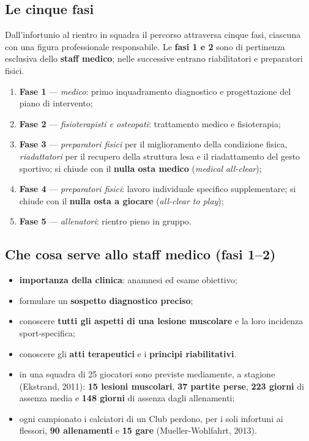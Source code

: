 \subsection{Le cinque fasi}

Dall'infortunio al rientro in squadra il percorso attraversa cinque fasi, ciascuna con una figura
professionale responsabile. Le \textbf{fasi 1 e 2} sono di pertinenza esclusiva dello \textbf{staff
medico}; nelle successive entrano riabilitatori e preparatori fisici.

\begin{enumerate}
  \item \textbf{Fase 1} --- \textit{medico}: primo inquadramento diagnostico e progettazione del
    piano di intervento;
  \item \textbf{Fase 2} --- \textit{fisioterapisti e osteopati}: trattamento medico e fisioterapia;
  \item \textbf{Fase 3} --- \textit{preparatori fisici} per il miglioramento della condizione
    fisica, \textit{riadattatori} per il recupero della struttura lesa e il riadattamento del gesto
    sportivo; si chiude con il \textbf{nulla osta medico} (\textit{medical all-clear});
  \item \textbf{Fase 4} --- \textit{preparatori fisici}: lavoro individuale specifico
    supplementare; si chiude con il \textbf{nulla osta a giocare} (\textit{all-clear to play});
  \item \textbf{Fase 5} --- \textit{allenatori}: rientro pieno in gruppo.
\end{enumerate}

\subsection{Che cosa serve allo staff medico (fasi 1--2)}

\begin{itemize}
  \item \textbf{importanza della clinica}: anamnesi ed esame obiettivo;
  \item formulare un \textbf{sospetto diagnostico preciso};
  \item conoscere \textbf{tutti gli aspetti di una lesione muscolare} e la loro incidenza
    sport-specifica;
  \item conoscere gli \textbf{atti terapeutici} e i \textbf{principi riabilitativi}.
\end{itemize}

\begin{itemize}
  \item in una squadra di 25 giocatori sono previste mediamente, a stagione (Ekstrand, 2011):
    \textbf{15 lesioni muscolari}, \textbf{37 partite perse}, \textbf{223 giorni} di assenza media e
    \textbf{148 giorni} di assenza dagli allenamenti;
  \item ogni campionato i calciatori di un Club perdono, per i soli infortuni ai flessori,
    \textbf{90 allenamenti} e \textbf{15 gare} (Mueller-Wohlfahrt, 2013).
\end{itemize}

